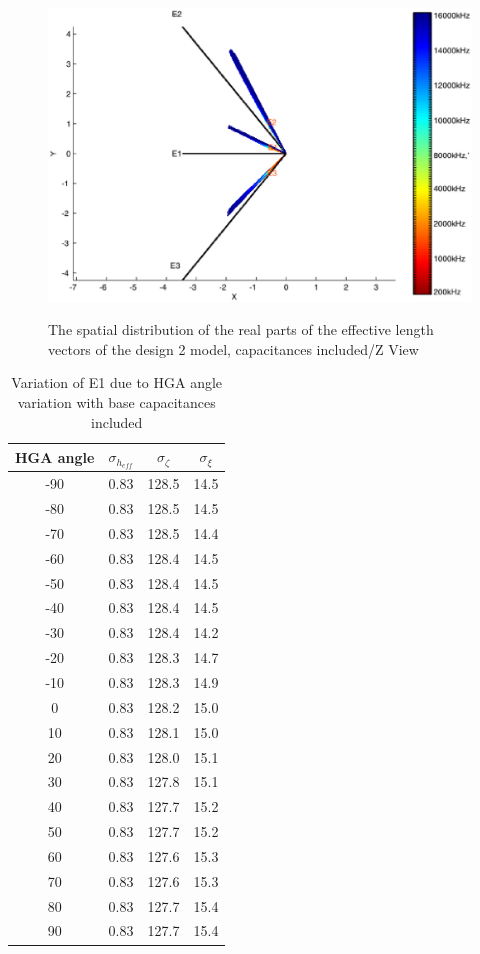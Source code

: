 \documentclass[a4paper,14pt]{extbook}
\begin{document}
\begin{figure}
\begin{center}
\includegraphics[width=12cm]{HeffVerteilungHGAD2-ZView_caps2.eps} \\
\caption{The spatial distribution of the real parts of the effective length vectors of the design 2 model, capacitances included/Z View}\label{fig_heff_dist_HGA_D2_A_Z_View_caps2}
\end{center}
\end{figure}


\begin{table}
\centering
\caption{Variation of E1 due to HGA angle variation with base capacitances included}\label{tab_e1_var}
\begin{tabular}{|c|c|c|c|}
  \hline
HGA angle & $\sigma_{h_{eff}}$ & $\sigma_{\zeta}$ & $\sigma_{\xi}$ \\
\hline
-90 & 0.83 & 128.5 & 14.5 \\
-80 & 0.83 & 128.5 & 14.5 \\
-70 & 0.83 & 128.5 & 14.4 \\
-60 & 0.83 & 128.4 & 14.5 \\
-50 & 0.83 & 128.4 & 14.5 \\
-40 & 0.83 & 128.4 & 14.5 \\
-30 & 0.83 & 128.4 & 14.2 \\
-20 & 0.83 & 128.3 & 14.7 \\
-10 & 0.83 & 128.3 & 14.9 \\
0 & 0.83 & 128.2 & 15.0 \\
10 & 0.83 & 128.1 & 15.0 \\
20 & 0.83 & 128.0 & 15.1 \\
30 & 0.83 & 127.8 & 15.1 \\
40 & 0.83 & 127.7 & 15.2 \\
50 & 0.83 & 127.7 & 15.2 \\
60 & 0.83 & 127.6 & 15.3 \\
70 & 0.83 & 127.6 & 15.3 \\
80 & 0.83 & 127.7 & 15.4 \\
90 & 0.83 & 127.7 & 15.4 \\
\hline\end{tabular}
\end{table}
\end{document}
